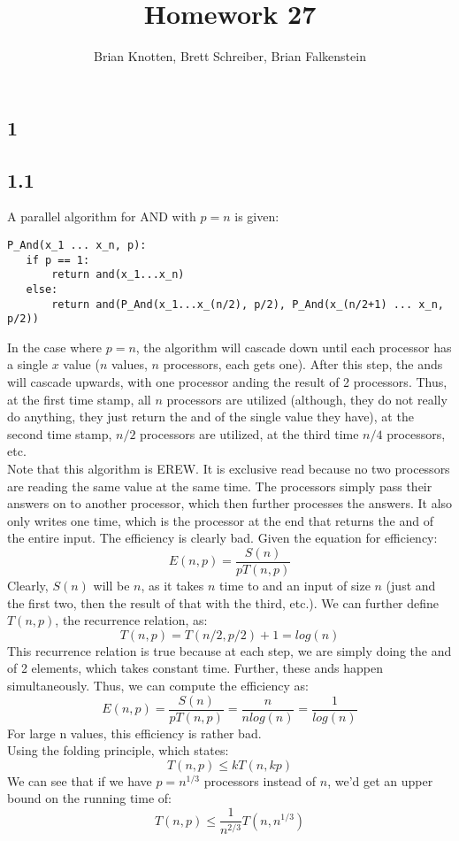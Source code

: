 \documentclass[letterpaper,notitlepage,twoside]{article}
\begin{document}
\title{Homework 27}
\author{Brian Knotten, Brett Schreiber, Brian Falkenstein}
\maketitle
\subsection*{1}
\subsection*{1.1}
A parallel algorithm for AND with $p=n$ is given:
\begin{verbatim}
P_And(x_1 ... x_n, p):
   if p == 1:
       return and(x_1...x_n)
   else:
       return and(P_And(x_1...x_(n/2), p/2), P_And(x_(n/2+1) ... x_n, p/2))
\end{verbatim}
In the case where $p=n$, the algorithm will cascade down until each processor has a single $x$ value ($n$ values, $n$ processors, each gets one). After this step, the ands will cascade upwards, with one processor anding the result of 2 processors. Thus, at the first time stamp, all $n$ processors are utilized (although, they do not really do anything, they just return the and of the single value they have), at the second time stamp, $n/2$ processors are utilized, at the third time $n/4$ processors, etc. \\
Note that this algorithm is EREW. It is exclusive read because no two processors are reading the same value at the same time. The processors simply pass their answers on to another processor, which then further processes the answers. It also only writes one time, which is the processor at the end that returns the and of the entire input. 
The efficiency is clearly bad. Given the equation for efficiency: 
$$ E(n, p) = \frac{S(n)}{pT(n, p)}$$
Clearly, $S(n)$ will be $n$, as it takes $n$ time to and an input of size $n$ (just and the first two, then the result of that with the third, etc.). We can further define $T(n, p)$, the recurrence relation, as:
$$T(n, p) = T(n/2, p/2) + 1 = log(n)$$
This recurrence relation is true because at each step, we are simply doing the and of 2 elements, which takes constant time. Further, these ands happen simultaneously. Thus, we can compute the efficiency as:
$$ E(n, p) = \frac{S(n)}{pT(n, p)} = \frac{n}{nlog(n)} = \frac{1}{log(n)}$$ 
For large n values, this efficiency is rather bad. \\
Using the folding principle, which states: 
$$T(n, p) \leq kT(n, kp)$$
We can see that if we have $p=n^{1/3}$ processors instead of $n$, we'd get an upper bound on the running time of:
$$T(n, p) \leq \frac{1}{n^{2/3}}T(n, n^{1/3})$$
\end{document}
